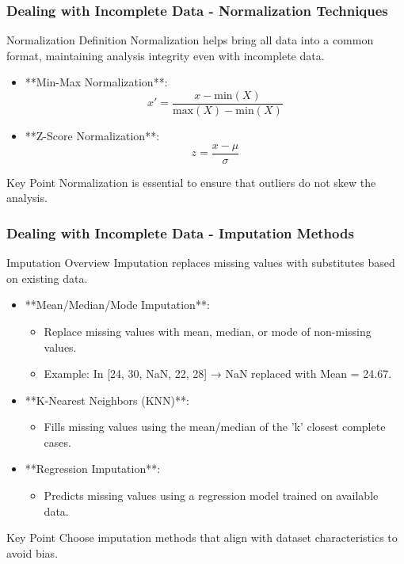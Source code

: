 \documentclass[aspectratio=169]{beamer}
\begin{document}
\begin{frame}[fragile]
    \frametitle{Dealing with Incomplete Data - Normalization Techniques}
    \begin{block}{Normalization Definition}
        Normalization helps bring all data into a common format, maintaining analysis integrity even with incomplete data.
    \end{block}
    \begin{itemize}
        \item **Min-Max Normalization**:
            \begin{equation}
            x' = \frac{x - \text{min}(X)}{\text{max}(X) - \text{min}(X)}
            \end{equation}
        \item **Z-Score Normalization**:
            \begin{equation}
            z = \frac{x - \mu}{\sigma}
            \end{equation}
        \end{itemize}
    \begin{block}{Key Point}
        Normalization is essential to ensure that outliers do not skew the analysis.
    \end{block}
\end{frame}

\begin{frame}[fragile]
    \frametitle{Dealing with Incomplete Data - Imputation Methods}
    \begin{block}{Imputation Overview}
        Imputation replaces missing values with substitutes based on existing data.
    \end{block}
    \begin{itemize}
        \item **Mean/Median/Mode Imputation**:
            \begin{itemize}
                \item Replace missing values with mean, median, or mode of non-missing values.
                \item Example: In [24, 30, NaN, 22, 28] → NaN replaced with Mean = 24.67.
            \end{itemize}
        \item **K-Nearest Neighbors (KNN)**:
            \begin{itemize}
                \item Fills missing values using the mean/median of the 'k' closest complete cases.
            \end{itemize}
        \item **Regression Imputation**:
            \begin{itemize}
                \item Predicts missing values using a regression model trained on available data.
            \end{itemize}
    \end{itemize}
    \begin{block}{Key Point}
        Choose imputation methods that align with dataset characteristics to avoid bias.
    \end{block}
\end{frame}
\end{document}
